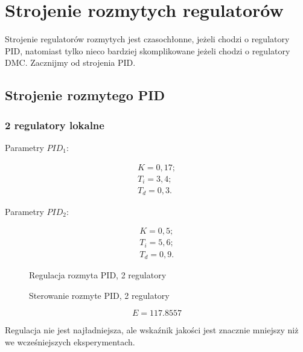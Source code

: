\chapter{Strojenie rozmytych regulatorów}

Strojenie regulatorów rozmytych jest czasochłonne, jeżeli chodzi o regulatory PID, natomiast tylko nieco bardziej skomplikowane jeżeli chodzi o regulatory DMC. Zacznijmy od strojenia PID.

\section{Strojenie rozmytego PID}

\subsection{2 regulatory lokalne}

Parametry $PID_1$:

\begin{equation}
\begin{matrix}
    	K = 0,17;\\
    	T_i = 3,4;\\
    	T_d = 0,3.
\end{matrix}
\end{equation}

Parametry $PID_2$:

\begin{equation}
\begin{matrix}
    	K = 0,5;\\
    	T_i = 5,6;\\
    	T_d = 0,9.
\end{matrix}
\end{equation}

\begin{figure}[H]
\centering

\caption{Regulacja rozmyta PID, 2 regulatory}
\end{figure}

\begin{figure}[H]
\centering

\caption{Sterowanie rozmyte PID, 2 regulatory}
\end{figure}

\begin{equation}
    E = \num{117,8557}
\end{equation}

Regulacja nie jest najładniejsza, ale wskaźnik jakości jest znacznie mniejszy niż we wcześniejszych eksperymentach.

